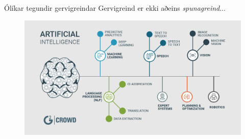\documentclass[
    NAME={Dr. Helga Ingimundardóttir},
    EMAIL={helgaingim@hi.is},
    FACULTY={Iðnaðarverkfræðideild},
    TITLE={Spáum fyrir um framtíð gervigreindar},
    SUBTITLE={út frá akademísku sjónarmiði},
    SEMINAR={Stjórnvísi},
    DATE={22. febrúar 2025},
    WIDE=true,
    ICELANDIC=true
]{HI-LaTeX/hi-beamer}
\begin{document}
\begin{frame}{Ólíkar tegundir gervigreindar}
Gervigreind er ekki aðeins \emph{spunagreind}...
    \begin{figure}
        \centering
        \includegraphics[width=.8\linewidth]{myndir/ai-types.png}
    \end{figure}
\end{frame}
\end{document}

